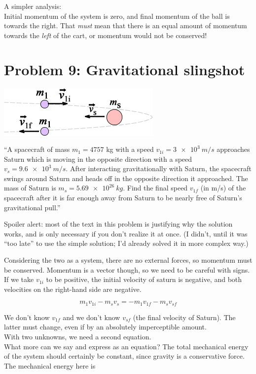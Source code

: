 \documentclass[12pt,a4paper]{report}
\begin{document}
A simpler analysis:\\
Initial momentum of the system is zero, and final momentum of the ball is towards the right. That \emph{must} mean that there is an equal amount of momentum towards the \emph{left} of the cart, or momentum would not be conserved!

\section{Problem 9: Gravitational slingshot}

\begin{center}
\includegraphics[scale=0.8]{Graphics/h6p9}
\end{center}

``A spacecraft of mass $m_1 = 4757$ kg with a speed $v_{1i} = \SI{3e3}{m/s}$ approaches Saturn which is moving in the opposite direction with a speed $v_s = \SI{9.6e3}{m/s}$. After interacting gravitationally with Saturn, the spacecraft swings around Saturn and heads off in the opposite direction it approached. The mass of Saturn is $m_s = \SI{5.69e26}{kg}$. Find the final speed $v_{1f}$ (in m/s) of the spacecraft after it is far enough away from Saturn to be nearly free of Saturn's gravitational pull.''

Spoiler alert: most of the text in this problem is justifying why the solution works, and is only necessary if you don't realize it at once. (I didn't, until it was ``too late'' to use the simple solution; I'd already solved it in more complex way.)

Considering the two as a system, there are no external forces, so momentum must be conserved. Momentum is a vector though, so we need to be careful with signs. If we take $v_{1i}$ to be positive, the initial velocity of saturn is negative, and both velocities on the right-hand side are negative.

\begin{equation}
m_1 v_{1i} - m_s v_s = - m_1 v_{1f} - m_s v_{sf}
\end{equation}

We don't know $v_{1f}$ and we don't know $v_{sf}$ (the final velocity of Saturn). The latter must change, even if by an absolutely imperceptible amount.\\
With two unknowns, we need a second equation.\\
What more can we say and express as an equation? The total mechanical energy of the system should certainly be constant, since gravity is a conservative force. The mechanical energy here is
\end{document}
